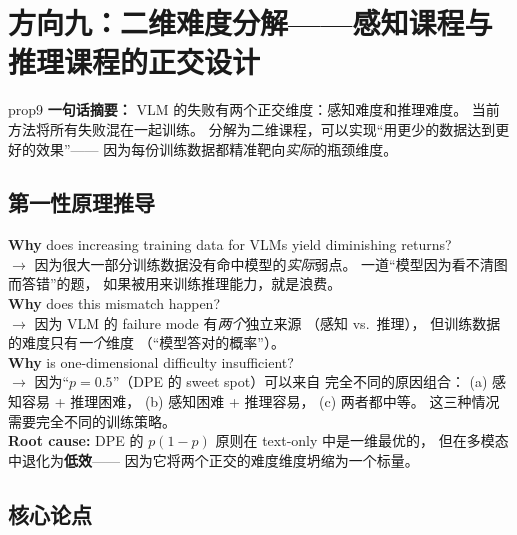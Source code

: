 \documentclass[12pt,a4paper]{article}
\begin{document}
\newpage
\section{方向九：二维难度分解——感知课程与推理课程的正交设计}
\label{sec:prop9}

\begin{proposalbox}{prop9}
\textbf{一句话摘要：}
VLM 的失败有两个正交维度：感知难度和推理难度。
当前方法将所有失败混在一起训练。
分解为二维课程，可以实现``用更少的数据达到更好的效果''——
因为每份训练数据都精准靶向\textit{实际}的瓶颈维度。
\end{proposalbox}

\subsection{第一性原理推导}

\begin{whybox}
\textbf{Why} does increasing training data for VLMs yield diminishing returns?\\
$\rightarrow$ 因为很大一部分训练数据没有命中模型的\textit{实际}弱点。
一道``模型因为看不清图而答错''的题，
如果被用来训练推理能力，就是浪费。\\[3pt]
\textbf{Why} does this mismatch happen?\\
$\rightarrow$ 因为 VLM 的 failure mode 有\textit{两个}独立来源
（感知 vs.\ 推理），
但训练数据的难度只有\textit{一个}维度
（``模型答对的概率''）。\\[3pt]
\textbf{Why} is one-dimensional difficulty insufficient?\\
$\rightarrow$ 因为``$p = 0.5$''（DPE 的 sweet spot）可以来自
完全不同的原因组合：
(a) 感知容易 + 推理困难，
(b) 感知困难 + 推理容易，
(c) 两者都中等。
这三种情况需要完全不同的训练策略。\\[3pt]
\textbf{Root cause:}
DPE 的 $p(1-p)$ 原则在 text-only 中是一维最优的，
但在多模态中退化为\textbf{低效}——
因为它将两个正交的难度维度坍缩为一个标量。
\end{whybox}

\subsection{核心论点}
\end{document}
